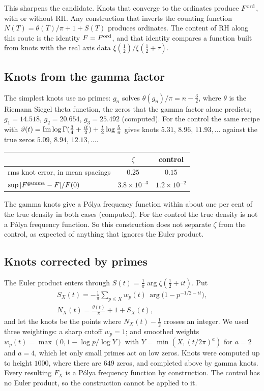 This sharpens the candidate. Knots that converge to the ordinates produce $F^{\rm ord}$, with or without RH. Any construction that inverts the counting function $N(T)=\theta(T)/\pi+1+S(T)$ produces ordinates. The content of RH along this route is the identity $F=F^{\rm ord}$, and that identity compares a function built from knots with the real axis data $\xi(\frac12)/\xi(\frac12+\tau)$.

\subsection{Knots from the gamma factor}

The simplest knots use no primes: $g_n$ solves $\theta(g_n)/\pi=n-\frac32$, where $\theta$ is the Riemann Siegel theta function, the zeros that the gamma factor alone predicts; $g_1=14.518$, $g_2=20.654$, $g_3=25.492$ (computed). For the control the same recipe with $\vartheta(t)=\operatorname{Im}\log\Gamma(\frac34+\frac{it}2)+\frac t2\log\frac5\pi$ gives knots $5.31$, $8.96$, $11.93,\dots$ against the true zeros $5.09$, $8.94$, $12.13,\dots$.

\begin{center}
\footnotesize
\begin{tabular}{lcc}
\toprule
 & $\zeta$ & control\\
\midrule
rms knot error, in mean spacings & $0.25$ & $0.15$\\
$\sup|F^{\rm gamma}-F|/F(0)$ & $3.8\times10^{-3}$ & $1.2\times10^{-2}$\\
\bottomrule
\end{tabular}
\end{center}
The gamma knots give a P\'olya frequency function within about one per cent of the true density in both cases (computed). For the control the true density is not a P\'olya frequency function. So this construction does not separate $\zeta$ from the control, as expected of anything that ignores the Euler product.

\subsection{Knots corrected by primes}

The Euler product enters through $S(t)=\frac1\pi\arg\zeta(\frac12+it)$. Put
\begin{gather*}
S_X(t)=-\frac1\pi\sum_{p\le X}w_p(t)\,\arg\big(1-p^{-1/2-it}\big),\\
N_X(t)=\frac{\theta(t)}\pi+1+S_X(t),
\end{gather*}
and let the knots be the points where $N_X(t)-\frac12$ crosses an integer. We used three weightings: a sharp cutoff $w_p=1$; and smoothed weights $w_p(t)=\max(0,1-\log p/\log Y)$ with $Y=\min(X,(t/2\pi)^a)$ for $a=2$ and $a=4$, which let only small primes act on low zeros. Knots were computed up to height $1000$, where there are $649$ zeros, and completed above by gamma knots. Every resulting $F_X$ is a P\'olya frequency function by construction. The control has no Euler product, so the construction cannot be applied to it.

